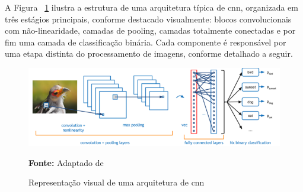 A Figura ~\ref{fig:cnn_architecture} ilustra a estrutura de uma arquitetura típica de \gls{cnn}, organizada em três estágios principais, conforme destacado visualmente: blocos convolucionais com não-linearidade, camadas de pooling, camadas totalmente conectadas e por fim uma camada de classificação binária. Cada componente é responsável por uma etapa distinta do processamento de imagens, conforme detalhado a seguir.

\begin{figure}[H]
    \centering
    \caption{Representação visual de uma arquitetura de \gls{cnn}}
    \vspace{0.5cm}
    \includegraphics[width=15cm]{images/monografia.png}
    \vspace{0.5cm}
    {\small \textbf{Fonte:} Adaptado de  \par}
    \label{fig:cnn_architecture}
\end{figure}

